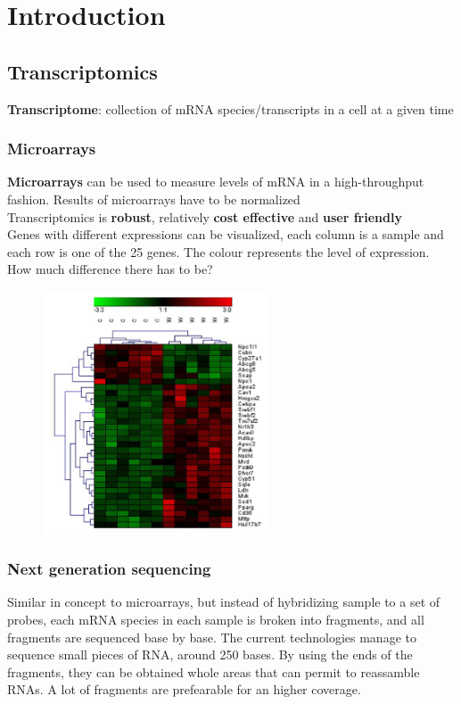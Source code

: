 \graphicspath{{chapters/images/01/}}


\chapter{Introduction}

\section{Transcriptomics}
\textbf{Transcriptome}: collection of mRNA species/transcripts in a cell at a given time\\

\subsection{Microarrays}
\textbf{Microarrays} can be used to measure levels of mRNA in a high-throughput fashion. Results of microarrays have to be normalized \cite{smythNormalizationCDNAMicroarray2003}
\\
Transcriptomics is \textbf{robust}, relatively \textbf{cost effective} and \textbf{user friendly}
\\
Genes with different expressions can be visualized, each column is a sample and each row is one of the 25 genes. The colour represents the level of expression. How much difference there has to be?


\begin{figure}[h]
\caption{}
\centering
\includegraphics[width=0.6\textwidth]{MicroRNAresults}
\end{figure}

\subsection{Next generation sequencing}
Similar in concept to microarrays, but instead of hybridizing sample to a set
of probes, each mRNA species in each sample is broken into fragments, and
all fragments are sequenced base by base. The current technologies manage to sequence small pieces of RNA, around 250 bases. By using the ends of the fragments, they can be obtained whole areas that can permit to reassamble RNAs. A lot of fragments are prefearable for an higher coverage.


